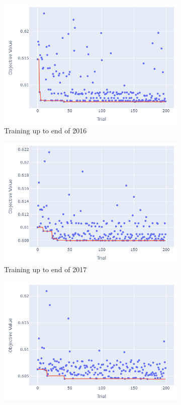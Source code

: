 \documentclass[12pt,twoside]{report}
\begin{document}
\begin{figure}[htb]
\centering
\captionsetup{justification=centering}
\begin{subfigure}{.33\linewidth}
  \centering
  \includegraphics[width=0.95\linewidth]{figures/va_lr_cutoff_2016.png}
  \caption{Training up to end of 2016}
\end{subfigure}%
\begin{subfigure}{.33\linewidth}
  \centering
  \includegraphics[width=0.95\linewidth]{figures/va_lr_cutoff_2017.png}
  \caption{Training up to end of 2017}
\end{subfigure}%
\begin{subfigure}{.33\linewidth}
  \centering
  \includegraphics[width=0.95\linewidth]{figures/va_lr_cutoff_2018.png}

\end{subfigure}
\end{figure}
\end{document}
